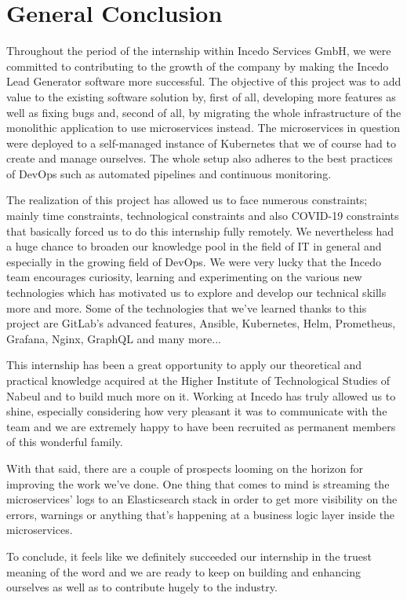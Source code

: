 \section*{General Conclusion}
Throughout the period of the internship within Incedo Services GmbH, we were committed to contributing to the growth of the company by making the Incedo Lead Generator software more successful.
The objective of this project was to add value to the existing software solution by, first of all, developing more features as well as fixing bugs and, second of all, by migrating the whole infrastructure of the monolithic application to use microservices instead.
The microservices in question were deployed to a self-managed instance of Kubernetes that we of course had to create and manage ourselves.
The whole setup also adheres to the best practices of DevOps such as automated pipelines and continuous monitoring.

The realization of this project has allowed us to face numerous constraints; mainly time constraints, technological constraints and also COVID-19 constraints that basically forced us to do this internship fully remotely. We nevertheless had a huge chance to broaden our knowledge pool in the field of IT in general and especially in the growing field of DevOps.
We were very lucky that the Incedo team encourages curiosity, learning and experimenting on the various new technologies which has motivated us to explore and develop our technical skills more and more.
Some of the technologies that we've learned thanks to this project are GitLab's advanced features, Ansible, Kubernetes, Helm, Prometheus, Grafana, Nginx, GraphQL and many more...

This internship has been a great opportunity to apply our theoretical and practical knowledge acquired at the Higher Institute of Technological Studies of Nabeul and to build much more on it.
Working at Incedo has truly allowed us to shine, especially considering how very pleasant it was to communicate with the team and we are extremely happy to have been recruited as permanent members of this wonderful family.

With that said, there are a couple of prospects looming on the horizon for improving the work we've done.
One thing that comes to mind is streaming the microservices' logs to an Elasticsearch stack in order to get more visibility on the errors, warnings or anything that's happening at a business logic layer inside the microservices.

To conclude, it feels like we definitely succeeded our internship in the truest meaning of the word and we are ready to keep on building and enhancing ourselves as well as to contribute hugely to the industry.
